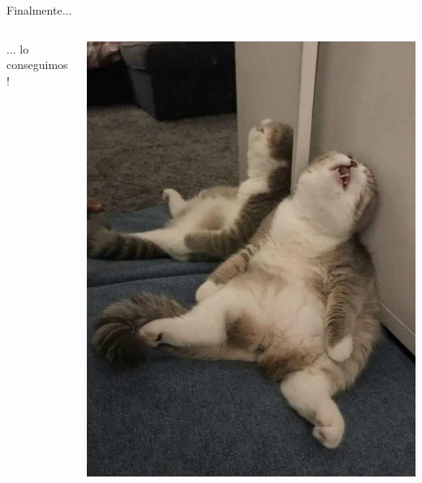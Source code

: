 
\begin{frame}{Finalmente...}

    \begin{columns}[T]
        \begin{column}{0.48\linewidth}
            \vspace{3.3cm}

            \Huge ... lo conseguimos!
        \end{column}
        \begin{column}{0.5\linewidth}
            
            \includegraphics[height=0.8\textheight, width=\linewidth]{img/dead.png}
        \end{column}
        
    \end{columns}
    
\end{frame}